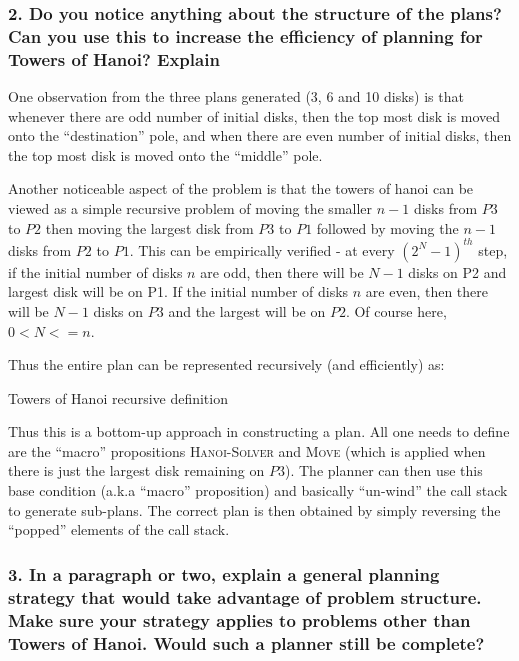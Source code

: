 \documentclass[10pt, letter]{article}
\begin{document}
\subsubsection*{2. Do you notice anything about the structure of the plans? Can you use this to increase the
efficiency of planning for Towers of Hanoi? Explain}
One observation from the three plans generated (3, 6 and 10 disks) is that whenever there are odd number of initial disks, then the top most disk is moved onto the ``destination'' pole, and when there are even number of initial disks, then the top most disk is moved onto the ``middle'' pole.

Another noticeable aspect of the problem is that the towers of hanoi can be viewed as a simple recursive problem of moving the smaller $n-1$ disks from $P3$ to $P2$ then moving the largest disk from $P3$ to $P1$ followed by moving the $n-1$ disks from $P2$ to $P1$. This can be empirically verified - at every $(2^N - 1)^{th}$ step, if the initial number of disks $n$ are odd, then there will be $N-1$ disks on P2 and largest disk will be on P1. If the initial number of disks $n$ are even, then there will be $N-1$ disks on $P3$ and the largest will be on $P2$. Of course here, $0<N<=n$.

Thus the entire plan can be represented recursively (and efficiently) as: 
\begin{algorithm}
  \caption{Towers of Hanoi recursive definition}
  \begin{algorithmic}[1]
		\State {}
		\State {} 
	  	\State {}
    \EndFunction
  \end{algorithmic}
\end{algorithm}

Thus this is a bottom-up approach in constructing a plan. All one needs to define are the ``macro'' propositions \textsc{Hanoi-Solver} and \textsc{Move} (which is applied when there is just the largest disk remaining on $P3$). The planner can then use this base condition (a.k.a ``macro'' proposition) and basically ``un-wind'' the call stack to generate sub-plans. The correct plan is then obtained by simply reversing the ``popped'' elements of the call stack.


\subsubsection*{3. In a paragraph or two, explain a general planning strategy that would take advantage of
problem structure. Make sure your strategy applies to problems other than Towers of Hanoi.
Would such a planner still be complete?}
\end{document}
